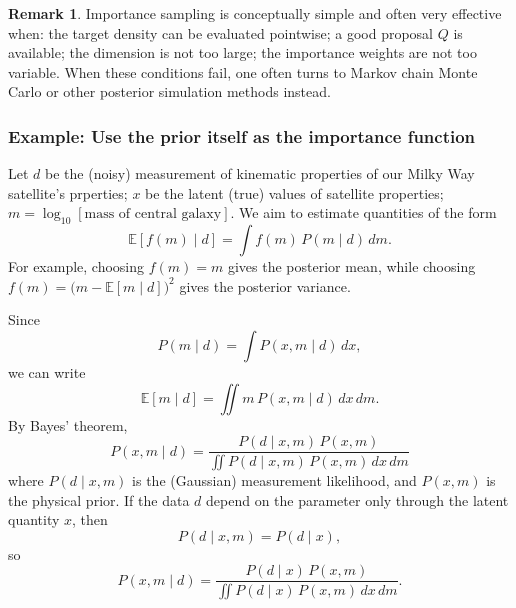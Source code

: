 \documentclass[11pt, titlepage]{article} %
\numberwithin{equation}{section}
\theoremstyle{definition}
\newtheorem{remark}{Remark}
\numberwithin{assumption}{section}
\begin{document}
\begin{remark}
    Importance sampling is conceptually simple and often very effective when: the target density can be evaluated pointwise;
    a good proposal $Q$ is available;
    the dimension is not too large;
    the importance weights are not too variable. When these conditions fail, one often turns to Markov chain Monte Carlo or other posterior simulation methods instead.
\end{remark}



\subsubsection*{Example: Use the prior itself as the importance function}

Let $d$ be the (noisy) measurement of kinematic properties of our Milky Way satellite's prperties; $x$ be the latent (true) values of satellite properties; $m=\log_{10}[\text{mass of central galaxy}]$. We aim to estimate quantities of the form
\begin{equation*}
    \mathbb{E}[f(m)\mid d]=\int f(m)\,P(m\mid d)\,dm.
\end{equation*}
For example, choosing $f(m)=m$ gives the posterior mean, while choosing $f(m)=\bigl(m-\mathbb{E}[m\mid d]\bigr)^2$ gives the posterior variance.

Since
\begin{equation*}
    P(m\mid d)=\int P(x,m\mid d)\,dx,
\end{equation*}
we can write
\begin{equation*}
    \mathbb{E}[m\mid d]
    =
    \iint m\,P(x,m\mid d)\,dx\,dm.
\end{equation*}
By Bayes' theorem,
\begin{equation*}
    P(x,m\mid d)
    = \frac{P(d\mid x,m)\,P(x,m)}
    {\iint P(d\mid x,m)\,P(x,m)\,dx\,dm}
\end{equation*}
where $P(d\mid x,m)$ is the (Gaussian) measurement likelihood, and $P(x,m)$ is the physical prior. 
If the data $d$ depend on the parameter only through the latent quantity $x$, then
\begin{equation*}
    P(d\mid x,m)=P(d\mid x),
\end{equation*}
so
\begin{equation*}
    P(x,m\mid d)
    =
    \frac{P(d\mid x)\,P(x,m)}
    {\iint P(d\mid x)\,P(x,m)\,dx\,dm}.
\end{equation*}
\end{document}
